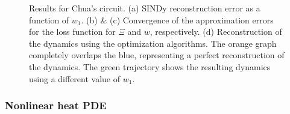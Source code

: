 \documentclass
[
    a4paper,
    DIV=11,
    abstract=true,
    11pt,
]
{scrartcl}
\theoremstyle{definition}
\begin{document}
\begin{figure}
\begin{minipage}[t]{0.4\linewidth}
{    }
    \end{minipage}
    \begin{minipage}[t]{0.4\linewidth}
    \centering
    \end{minipage}
    \caption{Results for Chua's circuit. (a) SINDy reconstruction error as a function of $ w_1 $. (b) \& (c) Convergence of the approximation errors for the loss function for $\Xi$ and $w$, respectively. (d) Reconstruction of the dynamics using the optimization algorithms. The orange graph completely overlaps the blue, representing a perfect reconstruction of the dynamics. The green trajectory shows the resulting dynamics using a different value of $ w_1 $.}
    \label{fig:modchua_results}
\end{figure}

\subsubsection{Nonlinear heat PDE}
\end{document}
